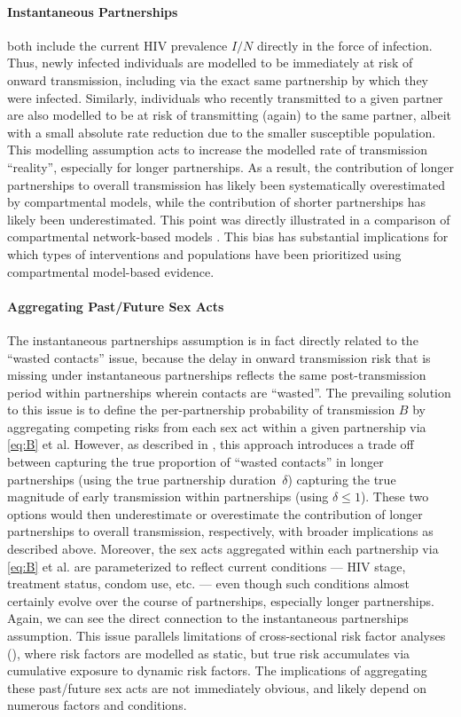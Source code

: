 \paragraph{Instantaneous Partnerships}
 both include
the current HIV prevalence $I/N$ directly in the force of infection.
Thus, newly infected individuals are modelled to be
immediately at risk of onward transmission,
including via the exact same partnership by which they were infected.
Similarly, individuals who recently transmitted to a given partner are also modelled to be
at risk of transmitting (again) to the same partner,
albeit with a small absolute rate reduction due to the smaller susceptible population.
This modelling assumption acts to increase the modelled rate of transmission \vs ``reality'',
especially for longer partnerships.
As a result, the contribution of longer partnerships to overall transmission
has likely been systematically overestimated by compartmental models,
while the contribution of shorter partnerships has likely been underestimated.
This point was directly illustrated in 
a comparison of compartmental \vs network-based models \cite{Johnson2016mf}.
This bias has substantial implications for which types of interventions and populations
have been prioritized using compartmental model-based evidence.
\paragraph{Aggregating Past/Future Sex Acts}
The instantaneous partnerships assumption is in fact
directly related to the ``wasted contacts'' issue,
because the delay in onward transmission risk that is missing under instantaneous partnerships
reflects the same post-transmission period within partnerships wherein contacts are ``wasted''.
The prevailing solution to this issue is to
define the per-partnership probability of transmission $B$ by
aggregating competing risks from each sex act within a given partnership via \eqref{eq:B} et al.
However, as described in , this approach introduces a trade off between
capturing the true proportion of ``wasted contacts'' in longer partnerships
(using the true partnership duration~$\delta$)
\vs capturing the true magnitude of early transmission within partnerships (using $\delta \le 1$).
These two options would then underestimate or overestimate
the contribution of longer partnerships to overall transmission, respectively,
with broader implications as described above.
Moreover, the sex acts aggregated within each partnership via \eqref{eq:B} et al.
are parameterized to reflect current conditions
--- \ie HIV stage, treatment status, condom use, etc. ---
even though such conditions almost certainly evolve over the course of partnerships,
especially longer partnerships.
Again, we can see the direct connection to the instantaneous partnerships assumption.
This issue parallels limitations of cross-sectional risk factor analyses
(\eg {}),
where risk factors are modelled as static,
but true risk accumulates via cumulative exposure to dynamic risk factors.
The implications of aggregating these past/future sex acts are not immediately obvious,
and likely depend on numerous factors and conditions.
